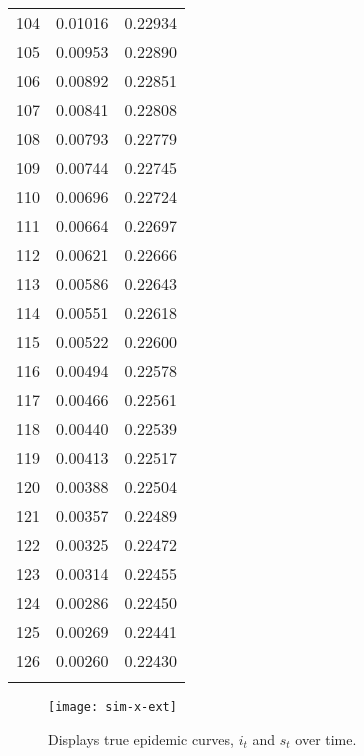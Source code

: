 \documentclass{elsarticle}
\begin{document}
\begin{center}
\begin{longtable}{|c|cc|}
  104 & 0.01016 & 0.22934 \\
  105 & 0.00953 & 0.22890 \\
  106 & 0.00892 & 0.22851 \\
  107 & 0.00841 & 0.22808 \\
  108 & 0.00793 & 0.22779 \\
  109 & 0.00744 & 0.22745 \\
  110 & 0.00696 & 0.22724 \\
  111 & 0.00664 & 0.22697 \\
  112 & 0.00621 & 0.22666 \\
  113 & 0.00586 & 0.22643 \\
  114 & 0.00551 & 0.22618 \\
  115 & 0.00522 & 0.22600 \\
  116 & 0.00494 & 0.22578 \\
  117 & 0.00466 & 0.22561 \\
  118 & 0.00440 & 0.22539 \\
  119 & 0.00413 & 0.22517 \\
  120 & 0.00388 & 0.22504 \\
  121 & 0.00357 & 0.22489 \\
  122 & 0.00325 & 0.22472 \\
  123 & 0.00314 & 0.22455 \\
  124 & 0.00286 & 0.22450 \\
  125 & 0.00269 & 0.22441 \\
  126 & 0.00260 & 0.22430 \\ 
\label{fig:x}
\end{longtable}
\end{center}

\clearpage

\begin{figure}[ht]
\texttt{[image: sim-x-ext]}
\caption{Displays true epidemic curves, $i_t$ and $s_t$ over time.}
\end{figure}
\end{document}
